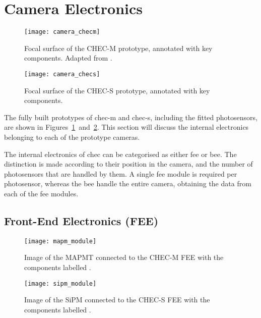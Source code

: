\section{Camera Electronics}

\begin{figure}
	\centering
    \texttt{[image: camera\_checm]} 
	\caption[Image of the CHEC-M focal surface.]{Focal surface of the CHEC-M prototype, annotated with key components. Adapted from \textcite{Zorn2017}.}
	\label{fig:camera_checm}
\end{figure}

\begin{figure}
	\centering
    \texttt{[image: camera\_checs]} 
	\caption[Image of the CHEC-S focal surface.]{Focal surface of the CHEC-S prototype, annotated with key components.}
	\label{fig:camera_checs}
\end{figure}

The fully built prototypes of \gls{chec-m} and \gls{chec-s}, including the fitted photosensors, are shown in Figures~\ref{fig:camera_checm}~and~\ref{fig:camera_checs}. This section will discuss the internal electronics belonging to each of the prototype cameras.

The internal electronics of \gls{chec} can be categorised as either \gls{fee} or \gls{bee}. The distinction is made according to their position in the camera, and the number of photosensors that are handled by them. A single \gls{fee} module is required per photosensor, whereas the \gls{bee} handle the entire camera, obtaining the data from each of the \gls{fee} modules.

\subsection{Front-End Electronics (FEE)}

\begin{figure}
	\centering
    \texttt{[image: mapm\_module]} 
	\caption[Image of the MAPMT and FEE for CHEC-M.]{Image of the MAPMT connected to the CHEC-M FEE with the components labelled \cite{Zorn2017,DeFranco2016}.}
	\label{fig:mapm_module}
\end{figure}

\begin{figure}
	\centering
    \texttt{[image: sipm\_module]} 
	\caption[Image of the SiPM and FEE for CHEC-S.]{Image of the SiPM connected to the CHEC-S FEE with the components labelled \cite{White2017}.}
	\label{fig:sipm_module}
\end{figure}

